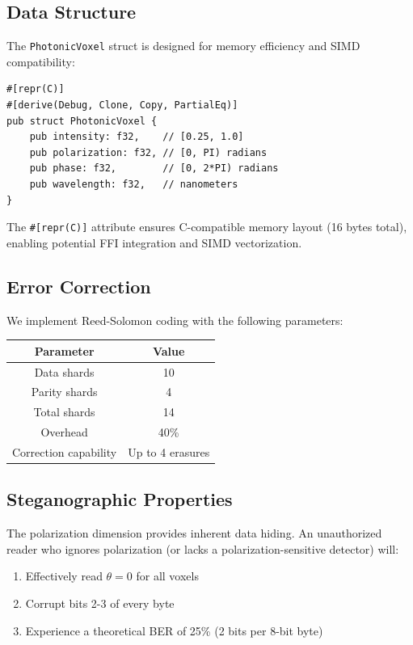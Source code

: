 \documentclass[11pt,a4paper]{article}
\begin{document}
\subsection{Data Structure}

The \texttt{PhotonicVoxel} struct is designed for memory efficiency and SIMD compatibility:

\begin{lstlisting}[style=rust, caption={PhotonicVoxel definition in Rust}]
#[repr(C)]
#[derive(Debug, Clone, Copy, PartialEq)]
pub struct PhotonicVoxel {
    pub intensity: f32,    // [0.25, 1.0]
    pub polarization: f32, // [0, PI) radians
    pub phase: f32,        // [0, 2*PI) radians
    pub wavelength: f32,   // nanometers
}
\end{lstlisting}

The \texttt{\#[repr(C)]} attribute ensures C-compatible memory layout (16 bytes total), enabling potential FFI integration and SIMD vectorization.

\subsection{Error Correction}

We implement Reed-Solomon coding with the following parameters:

\begin{center}
\begin{tabular}{cc}
\toprule
Parameter & Value \\
\midrule
Data shards & 10 \\
Parity shards & 4 \\
Total shards & 14 \\
Overhead & 40\% \\
Correction capability & Up to 4 erasures \\
\bottomrule
\end{tabular}
\end{center}

\subsection{Steganographic Properties}

The polarization dimension provides inherent data hiding. An unauthorized reader who ignores polarization (or lacks a polarization-sensitive detector) will:

\begin{enumerate}
    \item Effectively read $\theta = 0$ for all voxels
    \item Corrupt bits 2-3 of every byte
    \item Experience a theoretical BER of 25\% (2 bits per 8-bit byte)
\end{enumerate}
\end{document}
